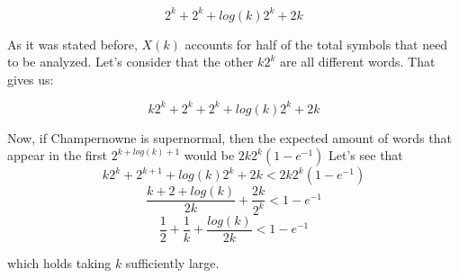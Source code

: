 \documentclass[10pt, a4paper]{article}
\theoremstyle{definition}
\begin{document}
$$2^k + 2^k + log(k)2^k + 2k$$

As it was stated before, $X(k)$ accounts for half of the total symbols that need to be analyzed. Let's consider that the other $k2^k$ are all different words. That gives us:

$$ k2^k + 2^k + 2^k + log(k)2^k + 2k$$

Now, if Champernowne is supernormal, then the expected amount of words that appear in the first $2^{k + log(k) + 1}$ would be $2k2^k(1-e^{-1})$
Let's see that 
$$ k2^k + 2^{k+1} +  log(k)2^k + 2k < 2k2^k(1-e^{-1}) $$
$$ \frac{k + 2 +  log(k)}{2k} + \frac{2k}{2^k} < 1-e^{-1} $$
$$ \frac{1}{2} + \frac{1}{k} + \frac{log(k)}{2k} < 1-e^{-1} $$

which holds taking $k$ sufficiently large.




\end{document}
